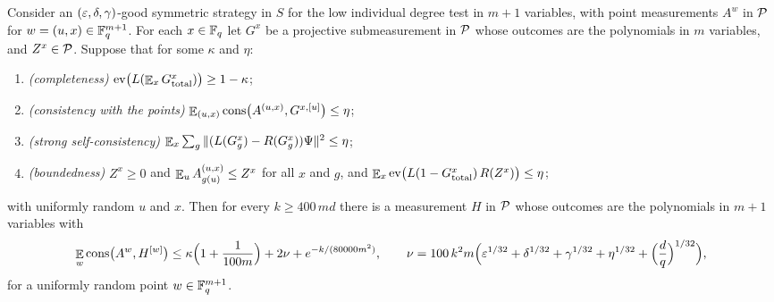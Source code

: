 \begin{lemma}
\label{lem:co-ld-pasting}
\leanok
Consider an $(\eps, \delta, \gamma)$-good symmetric strategy in $S$ for the low individual degree
test in $m + 1$ variables, with point measurements $A^w$ in $\cal{P}$ for $w = (u, x) \in
\Fq^{m+1}$. For each $x \in \Fq$ let $G^x$ be a projective submeasurement in $\cal{P}$ whose
outcomes are the polynomials in $m$ variables, and $Z^x \in \cal{P}$. Suppose that for some
$\kappa$ and $\eta$:
\begin{enumerate}
  \item \emph{(completeness)} $\mathrm{ev}\bigl(L(\E_x G^x_{\mathrm{total}})\bigr) \geq 1 - \kappa$;
  \item \emph{(consistency with the points)} $\E_{(u, x)} \mathrm{cons}\bigl(A^{(u, x)},
    G^{x, [u]}\bigr) \leq \eta$;
  \item \emph{(strong self-consistency)} $\E_x \sum_g \| (L(G^x_g) - R(G^x_g)) \Psi \|^2 \leq
    \eta$;
  \item \emph{(boundedness)} $Z^x \geq 0$ and $\E_u A^{(u, x)}_{g(u)} \leq Z^x$ for all $x$ and
    $g$, and $\E_x \mathrm{ev}\bigl(L(1 - G^x_{\mathrm{total}})\, R(Z^x)\bigr) \leq \eta$;
\end{enumerate}
with uniformly random $u$ and $x$. Then for every $k \geq 400\, m d$ there is a measurement $H$ in
$\cal{P}$ whose outcomes are the polynomials in $m + 1$ variables with
\[
  \E_w \mathrm{cons}\bigl(A^w, H^{[w]}\bigr) \leq \kappa \Bigl(1 + \frac{1}{100 m}\Bigr) + 2 \nu +
  e^{-k / (80000 m^2)}, \qquad \nu = 100\, k^2 m \Bigl(\eps^{1/32} + \delta^{1/32} +
  \gamma^{1/32} + \eta^{1/32} + \Bigl(\frac{d}{q}\Bigr)^{1/32}\Bigr),
\]
for a uniformly random point $w \in \Fq^{m+1}$.
\end{lemma}

